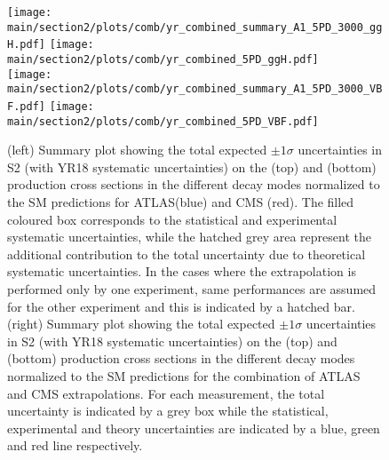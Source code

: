 \begin{figure}[hbtp]
\centering
\texttt{[image: \\main/section2/plots/comb/yr\_combined\_summary\_A1\_5PD\_3000\_ggH.pdf]}%
\texttt{[image: \\main/section2/plots/comb/yr\_combined\_5PD\_ggH.pdf]}\\
\texttt{[image: \\main/section2/plots/comb/yr\_combined\_summary\_A1\_5PD\_3000\_VBF.pdf]}%
\texttt{[image: \\main/section2/plots/comb/yr\_combined\_5PD\_VBF.pdf]}%
\caption{(left) Summary plot showing the total expected $\pm 1\sigma$ uncertainties in S2 (with YR18 systematic uncertainties) on the \ggh (top) and \vbf (bottom) production cross sections in the different decay modes normalized to the SM predictions   for ATLAS(blue)  and CMS (red). The filled coloured box corresponds to the statistical and experimental systematic uncertainties, while the hatched grey area represent the additional contribution to the total uncertainty due to theoretical systematic uncertainties. In the cases where  the extrapolation is performed only by one experiment, same performances are assumed for the other experiment and this is indicated by a  hatched bar.
(right) Summary plot showing the total expected $\pm 1\sigma$  uncertainties in S2 (with YR18 systematic uncertainties) on the \ggh (top) and \vbf (bottom) production cross sections in the different decay modes normalized to the SM predictions for the combination of ATLAS and CMS extrapolations. For each measurement,  the total uncertainty is indicated by a grey box while the statistical, experimental and theory uncertainties are indicated by a blue, green and red line respectively.}
\label{fig:summary_A1_5PD_ggH_VBF}
\end{figure}


